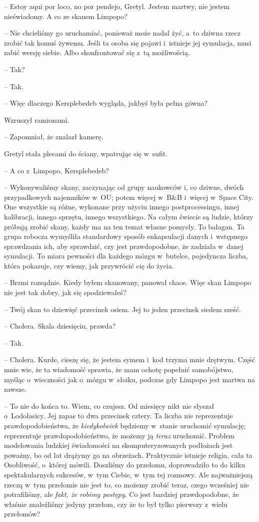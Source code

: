 \documentclass[oneside,polish,11pt,sfheadings]{mwbk}
\begin{document}
-- Estoy aqui por loco, no por pendejo, Gretyl. Jestem martwy, nie jestem
nieświadomy. A co ze skanem Limpopo?

-- Nie chcieliśmy go uruchamiać, ponieważ może nadal żyć, a~to dziwna
rzecz zrobić tak komuś żywemu. Jeśli ta osoba się pojawi i~istnieje jej
symulacja, musi zabić wersję siebie. Albo skonfrontować się z~tą
możliwością.

-- Tak?

-- Tak.

-- Więc dlaczego Kersplebedeb wygląda, jakbyś była pełna gówna?

Wzruszył ramionami. 

-- Zapomniał, że znalazł kamerę.

Gretyl stała plecami do ściany, wpatrując się w~sufit.

-- A co z~Limpopo, Kersplebedeb?

-- Wykonywaliśmy skany, zaczynając od grupy naukowców i, co dziwne, dwóch
przypadkowych najemników w~OU; potem więcej w~B\&B i~więcej w~Space
City. One wszystkie są różne, wykonane przy użyciu innego
postprocessingu, innej kalibracji, innego sprzętu, innego wszystkiego.
Na całym świecie są ludzie, którzy próbują zrobić skany, każdy ma na ten
temat własne pomysły. To bałagan. Ta grupa robocza wymyśliła standardowy
sposób enkapsulacji danych i~wstępnego sprawdzania ich, aby sprawdzić,
czy jest prawdopodobne, że zadziała w~danej symulacji. To miara pewności
dla każdego mózgu w~butelce, pojedyncza liczba, która pokazuje, czy
wiemy, jak przywrócić cię do życia.

-- Brzmi rozsądnie. Kiedy byłem skanowany, panował chaos. Więc skan
Limpopo nie jest tak dobry, jak się spodziewałeś?

-- Twój skan to dziewięć przecinek osiem. Jej to jeden przecinek siedem
sześć.

-- Cholera. Skala dziesięciu, prawda?

-- Tak.

-- Cholera. Kurde, cieszę się, że jestem symem i~kod trzyma mnie drętwym.
Część mnie wie, że ta wiadomość sprawia, że mam ochotę popełnić
samobójstwo, myśląc o~wieczności jak o~mózgu w~słoiku, podczas gdy
Limpopo jest martwa na zawsze.

-- To nie do końca to. Wiem, co czujesz. Od miesięcy nikt nie słyszał o~Lodołasicy. Jej zapas to dwa przecinek cztery. Ta liczba nie
reprezentuje prawdopodobieństwa, że \textit{kiedykolwiek }będziemy w~stanie uruchomić symulację; reprezentuje prawdopodobieństwo, że możemy
ją \textit{teraz} uruchomić. Problem modelowania ludzkiej świadomości na
skomputeryzowanych podłożach jest poważny, bo od lat drążymy go na
obrzeżach. Praktycznie istnieje religia, cała ta Osobliwość, o~której
mówili. Doszliśmy do przełomu, doprowadziło to do kilku spektakularnych
sukcesów, w~tym Ciebie, w~tym tej rozmowy. Ale najważniejszą rzeczą w~tym przełomie nie jest to, co możemy zrobić teraz, czego wcześniej nie
potrafiliśmy, ale \textit{fakt, że robimy postępy}. Co jest bardziej
prawdopodobne, że właśnie znaleźliśmy jedyny przełom, czy że to był
tylko pierwszy z~wielu przełomów?
\end{document}
